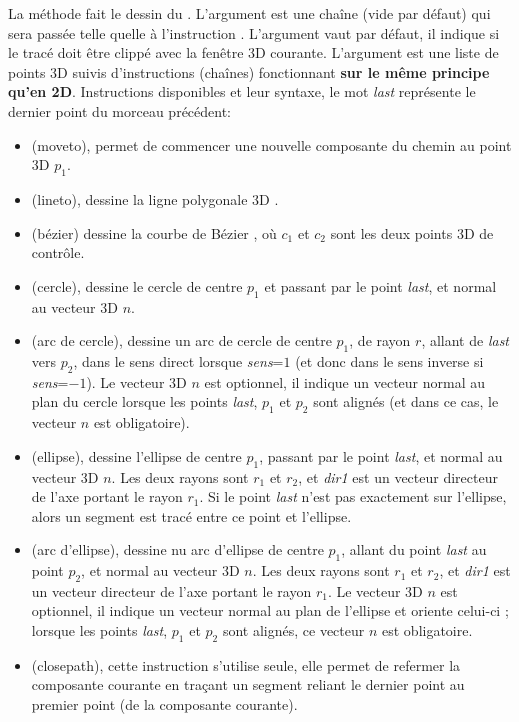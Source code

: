 La méthode  fait le dessin du . L'argument  est une chaîne (vide par défaut) qui sera passée telle quelle à l'instruction \drawcmd . L'argument  vaut \false par défaut, il indique si le tracé doit être clippé avec la fenêtre 3D courante. L'argument  est une liste de points 3D suivis d'instructions (chaînes) fonctionnant \textbf{sur le même principe qu'en 2D}. Instructions disponibles et leur syntaxe, le mot \emph{last} représente le dernier point du morceau précédent:
\begin{itemize}
    \item {} (moveto), permet de commencer une nouvelle composante du chemin au point 3D $p_1$.

    \item {} (lineto), dessine la ligne polygonale 3D .

    \item {} (bézier) dessine la courbe de Bézier , où $c_1$ et $c_2$ sont les deux points 3D de contrôle.

    \item {} (cercle), dessine le cercle de centre $p_1$ et passant par le point \emph{last}, et normal au vecteur 3D $n$.

    \item {} (arc de cercle), dessine un arc de cercle de centre $p_1$, de rayon $r$, allant de \emph{last} vers $p_2$, dans le sens direct lorsque \emph{sens}=$1$ (et donc dans le sens inverse si \emph{sens}=$-1$). Le vecteur 3D $n$ est optionnel, il indique un vecteur normal au plan du cercle lorsque les points \emph{last}, $p_1$ et $p_2$ sont alignés (et dans ce cas, le vecteur $n$ est obligatoire).
    
    \item {} (ellipse), dessine l'ellipse de centre $p_1$, passant par le point \emph{last}, et normal au vecteur 3D $n$. Les deux rayons sont $r_1$ et $r_2$, et \emph{dir1} est un vecteur directeur de l'axe portant le rayon $r_1$. Si le point \emph{last} n'est pas exactement sur l'ellipse, alors un segment est tracé entre ce point et l'ellipse.
    
    \item {} (arc d'ellipse), dessine nu arc d'ellipse de centre $p_1$, allant du point \emph{last} au point $p_2$, et normal au vecteur 3D $n$. Les deux rayons sont $r_1$ et $r_2$, et \emph{dir1} est un vecteur directeur de l'axe portant le rayon $r_1$. Le vecteur 3D $n$ est optionnel, il indique un vecteur normal au plan de l'ellipse et oriente celui-ci ; lorsque les points \emph{last}, $p_1$ et $p_2$ sont alignés, ce vecteur $n$ est obligatoire.  

    \item {} (closepath), cette instruction s'utilise seule, elle permet de refermer la composante courante en traçant un segment reliant le dernier point au premier point (de la composante courante).
\end{itemize}      

